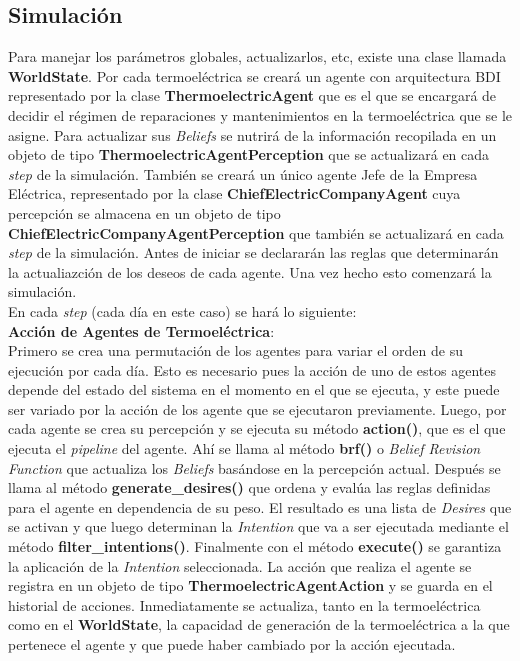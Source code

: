 \documentclass[twocolumn, fontsize=10pt]{article}
\begin{document}
\subsection{Simulación}

Para manejar los parámetros globales, actualizarlos, etc, existe una clase llamada \textbf{WorldState}. 
Por cada termoeléctrica se creará un agente con arquitectura BDI representado por la clase \textbf{ThermoelectricAgent}
que es el que se encargará de decidir el régimen de reparaciones y mantenimientos en la termoeléctrica que se le asigne. 
Para actualizar sus \textit{Beliefs} se nutrirá de la información recopilada en un objeto de tipo \textbf{ThermoelectricAgentPerception} que se actualizará en cada \textit{step} de la simulación. También se creará un único agente Jefe de la Empresa Eléctrica, representado por la clase
\textbf{ChiefElectricCompanyAgent} cuya percepción se almacena en un objeto de tipo \textbf{ChiefElectricCompanyAgentPerception} que también se actualizará en cada \textit{step} de la simulación. Antes de iniciar
 se declararán las reglas que determinarán la actualiazción de los deseos de cada agente. Una vez hecho esto comenzará la simulación.\\
 
 
 En cada \textit{step} (cada día en este caso) se hará lo siguiente:\\

 \textbf{Acción de Agentes de Termoeléctrica}:\\

Primero se crea una permutación de los agentes para variar el orden de su ejecución por cada día.
Esto es necesario pues la acción de uno de estos agentes depende del estado del sistema en el momento
en el que se ejecuta, y este puede ser variado por la acción de los agente que se ejecutaron previamente. 
Luego, por cada agente se crea su percepción y se ejecuta su método \textbf{action()}, que es el que ejecuta el \textit{pipeline} del agente. 
Ahí se llama al método \textbf{brf()} o \textit{Belief Revision Function} que actualiza los \textit{Beliefs} basándose en la percepción actual. 
Después se llama al método \textbf{generate\_desires()} que ordena y evalúa las reglas definidas para el agente en dependencia de su peso. El resultado
es una lista de \textit{Desires} que se activan y que luego determinan la \textit{Intention} que va a ser ejecutada mediante el método \textbf{filter\_intentions()}. Finalmente con el 
método \textbf{execute()} se garantiza la aplicación de la \textit{Intention} seleccionada. La acción que realiza el agente se registra en un objeto de tipo \textbf{ThermoelectricAgentAction} y se guarda en el historial de acciones.
Inmediatamente se actualiza, tanto en la termoeléctrica como en el \textbf{WorldState}, la capacidad de generación de la termoeléctrica a la que pertenece el agente y que puede haber cambiado por la acción ejecutada.\\
\end{document}
